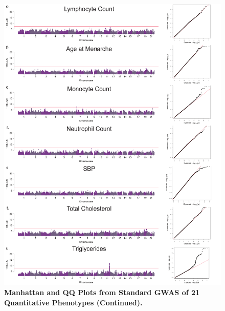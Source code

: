  
\begin{figure}[!htb]
\ContinuedFloat
\centering
\includegraphics[width=5in]{img/ch02/fig-s1c.pdf}
\caption[Manhattan and QQ Plots from Standard GWAS of 21 Quantitative Phenotypes (Continued).]{\textbf{Manhattan and QQ Plots from Standard GWAS of 21 Quantitative Phenotypes (Continued).} }
\label{fig:fig-s1c}
\end{figure}




